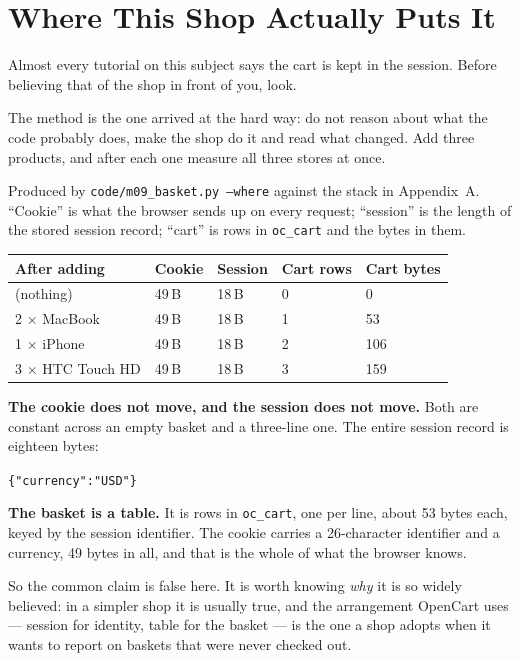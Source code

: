 \section{Where This Shop Actually Puts It}

Almost every tutorial on this subject says the cart is kept in the session.
Before believing that of the shop in front of you, look.

The method is the one  arrived at the hard way: do not reason
about what the code probably does, make the shop do it and read what changed.
Add three products, and after each one measure all three stores at once.

\begin{measured}
Produced by \texttt{code/m09\_basket.py --where} against the stack in
Appendix~A. ``Cookie'' is what the browser sends up on every request;
``session'' is the length of the stored session record; ``cart'' is rows in
\texttt{oc\_cart} and the bytes in them.

\begin{longtable}{@{}L{4.0cm}L{2.3cm}L{2.4cm}L{2.3cm}L{2.2cm}@{}}
\toprule
{}
\textbf{After adding} & \textbf{Cookie} & \textbf{Session} &
\textbf{Cart rows} & \textbf{Cart bytes} \\
\midrule
\endhead
(nothing) & 49\,B & 18\,B & 0 & 0 \\
2 $\times$ MacBook & 49\,B & 18\,B & 1 & 53 \\
1 $\times$ iPhone & 49\,B & 18\,B & 2 & 106 \\
3 $\times$ HTC Touch HD & 49\,B & 18\,B & 3 & 159 \\
\bottomrule
\end{longtable}

\smallskip
\textbf{The cookie does not move, and the session does not move.} Both are
constant across an empty basket and a three-line one. The entire session record
is eighteen bytes:

\smallskip
\hspace*{1em}\texttt{\{"currency":"USD"\}}

\smallskip
\textbf{The basket is a table.} It is rows in \texttt{oc\_cart}, one per line,
about 53 bytes each, keyed by the session identifier. The cookie carries a
26-character identifier and a currency, 49 bytes in all, and that is the whole
of what the browser knows.

\smallskip
So the common claim is false here. It is worth knowing \emph{why} it is so
widely believed: in a simpler shop it is usually true, and the arrangement
OpenCart uses --- session for identity, table for the basket --- is the one a
shop adopts when it wants to report on baskets that were never checked out.
\end{measured}

